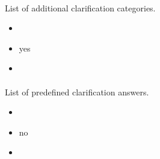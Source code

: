\documentclass[a4paper,10pt,english,openany]{sphinxmanual}
\begin{document}
\paragraph{}
\label{\detokenize{configuration-reference:clar-categories}}
\sphinxAtStartPar
List of additional clarification categories.
\begin{itemize}
\item {} 
\sphinxAtStartPar
{} 

\item {} 
\sphinxAtStartPar
{} yes

\item {} 
\sphinxAtStartPar
{}

\begin{sphinxVerbatim}[commandchars=\\\{\}]
\end{sphinxVerbatim}

\end{itemize}


\paragraph{}
\label{\detokenize{configuration-reference:clar-answers}}
\sphinxAtStartPar
List of pre\sphinxhyphen{}defined clarification answers.
\begin{itemize}
\item {} 
\sphinxAtStartPar
{} 

\item {} 
\sphinxAtStartPar
{} no

\item {} 
\sphinxAtStartPar
{}

\begin{sphinxVerbatim}[commandchars=\\\{\}]
\PYG{p}{[}
\PYG{p}{]}
\end{sphinxVerbatim}

\end{itemize}
\end{document}

